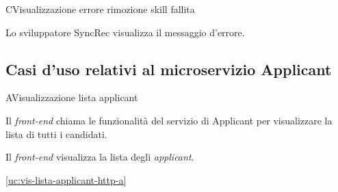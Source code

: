 \begin{usecase}{11}{C}{Visualizzazione errore rimozione skill fallita}



	\begin{ucscenarioprincipale}
		\item Lo sviluppatore SyncRec visualizza il messaggio d'errore.
	\end{ucscenarioprincipale}


	\label{uc:vis-errore-rimozione-skill-c}

\end{usecase}


\subsection{Casi d'uso relativi al microservizio Applicant}

\begin{usecase}{1}{A}{Visualizzazione lista applicant}



	\begin{ucscenarioprincipale}
		\item Il \textit{front-end} chiama le funzionalità del servizio di Applicant per visualizzare la lista di tutti i candidati.
		\item Il \textit{front-end} visualizza la lista degli \textit{applicant}.
	\end{ucscenarioprincipale}



	\begin{ucgeneralizzazioni}
		\item \ref{uc:vis-lista-applicant-http-a}
	\end{ucgeneralizzazioni}

	\label{uc:vis-lista-applicant-a}
\end{usecase}

